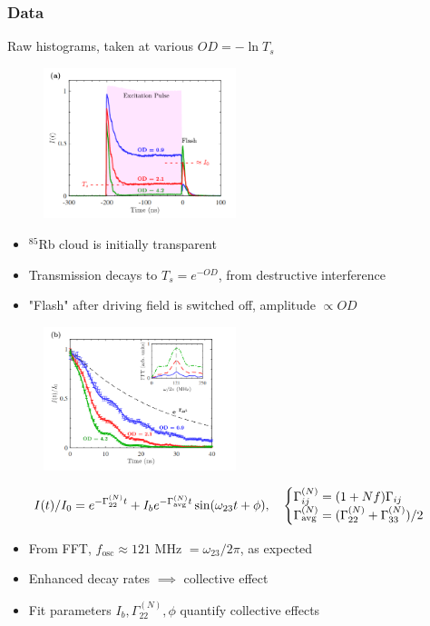 \documentclass{beamer}
\theoremstyle{definition}
\begin{document}
\begin{frame}
	\frametitle{Data} 
	Raw histograms, taken at various $OD = -\ln T_s$
	\begin{figure}[!htb]
		\centering
		\includegraphics[width=0.5\textwidth]{data_full.png}
	\end{figure}
	\begin{itemize}
		\item $^{85}$Rb cloud is initially transparent
		\item Transmission decays to $T_s = e^{-OD}$, from destructive interference 
		\item "Flash" after driving field is switched off, amplitude $\propto OD$
	\end{itemize}

\end{frame}



\begin{frame}
	\begin{figure}[!htb]
		\centering
		\includegraphics[width=0.5\textwidth]{data_zoom.png}
	\end{figure}
\begin{equation*}
I(t)/I_0 = e^{-\Gamma_{22}^{(N)}t} + I_b e^{-\Gamma_{\text{avg}}^{(N)}t} \sin(\omega_{23}t + \phi), \quad \begin{cases}
\textcolor{black}{\Gamma_{ij}^{(N)} = (1+ Nf) \Gamma_{ij}}\\
\textcolor{black}{\Gamma_\text{avg}^{(N)} = (\Gamma_{22}^{(N)} + \Gamma_{33}^{(N)})/2}
\end{cases}
\end{equation*}
\begin{itemize}
	\item From FFT, $f_\text{osc}\approx 121 $ MHz $= \omega_{23}/2\pi$, as expected
	\item Enhanced decay rates $\implies$ collective effect
	\item Fit parameters $I_b, \Gamma_{22}^{(N)}, \phi$ quantify collective effects
\end{itemize}


\end{frame}
\end{document}
